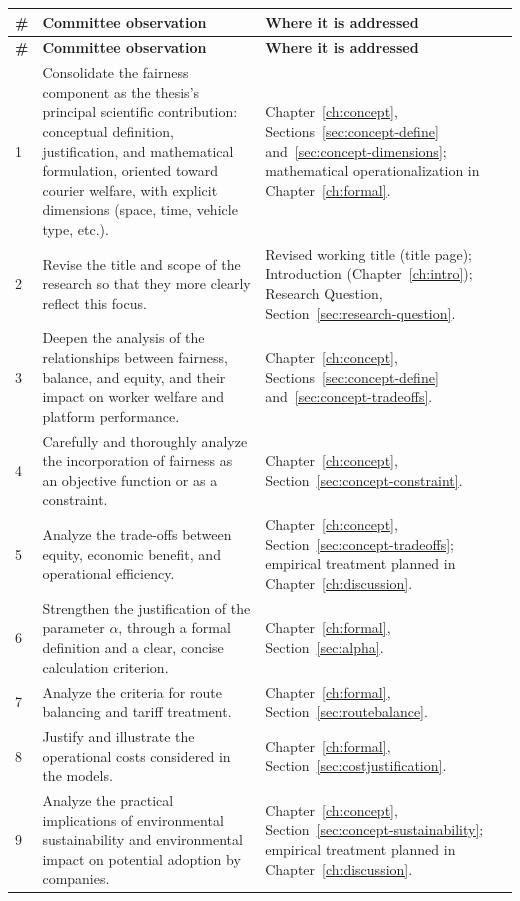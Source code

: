 \documentclass[12pt,a4paper]{report}
\begin{document}
\begingroup
\small
\begin{longtable}{p{0.6cm}p{6.3cm}p{7.4cm}}
\toprule
\textbf{\#} & \textbf{Committee observation} & \textbf{Where it is addressed} \\
\midrule
\endfirsthead
\toprule
\textbf{\#} & \textbf{Committee observation} & \textbf{Where it is addressed} \\
\midrule
\endhead
1 & Consolidate the fairness component as the thesis's principal scientific contribution: conceptual definition, justification, and mathematical formulation, oriented toward courier welfare, with explicit dimensions (space, time, vehicle type, etc.). &
Chapter~\ref{ch:concept}, Sections~\ref{sec:concept-define} and~\ref{sec:concept-dimensions}; mathematical operationalization in Chapter~\ref{ch:formal}. \\
\midrule
2 & Revise the title and scope of the research so that they more clearly reflect this focus. &
Revised working title (title page); Introduction (Chapter~\ref{ch:intro}); Research Question, Section~\ref{sec:research-question}. \\
\midrule
3 & Deepen the analysis of the relationships between fairness, balance, and equity, and their impact on worker welfare and platform performance. &
Chapter~\ref{ch:concept}, Sections~\ref{sec:concept-define} and~\ref{sec:concept-tradeoffs}. \\
\midrule
4 & Carefully and thoroughly analyze the incorporation of fairness as an objective function or as a constraint. &
Chapter~\ref{ch:concept}, Section~\ref{sec:concept-constraint}. \\
\midrule
5 & Analyze the trade-offs between equity, economic benefit, and operational efficiency. &
Chapter~\ref{ch:concept}, Section~\ref{sec:concept-tradeoffs}; empirical treatment planned in Chapter~\ref{ch:discussion}. \\
\midrule
6 & Strengthen the justification of the parameter $\alpha$, through a formal definition and a clear, concise calculation criterion. &
Chapter~\ref{ch:formal}, Section~\ref{sec:alpha}. \\
\midrule
7 & Analyze the criteria for route balancing and tariff treatment. &
Chapter~\ref{ch:formal}, Section~\ref{sec:routebalance}. \\
\midrule
8 & Justify and illustrate the operational costs considered in the models. &
Chapter~\ref{ch:formal}, Section~\ref{sec:costjustification}. \\
\midrule
9 & Analyze the practical implications of environmental sustainability and environmental impact on potential adoption by companies. &
Chapter~\ref{ch:concept}, Section~\ref{sec:concept-sustainability}; empirical treatment planned in Chapter~\ref{ch:discussion}. \\
\bottomrule
\end{longtable}
\endgroup
\end{document}
